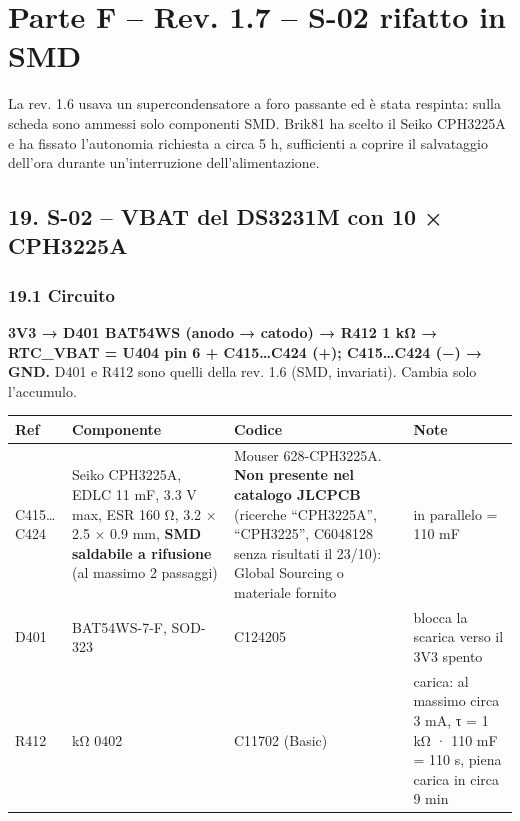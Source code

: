 \clearpage
\section[Parte F – Rev. 1.7 – S-02 rifatto in SMD]{Parte F – Rev. 1.7 – S-02 rifatto in SMD}

La rev. 1.6 usava un supercondensatore a foro passante ed è stata respinta: sulla scheda sono ammessi solo componenti SMD. Brik81 ha scelto il Seiko CPH3225A e ha fissato l'autonomia richiesta a circa 5 h, sufficienti a coprire il salvataggio dell'ora durante un'interruzione dell'alimentazione.

\subsection[19. S-02 – VBAT del DS3231M con 10 × CPH3225A]{19. S-02 – VBAT del DS3231M con 10 × CPH3225A }

\subsubsection[19.1 Circuito]{19.1 Circuito}

\textbf{3V3 → D401 BAT54WS (anodo → catodo) → R412 1 kΩ → RTC\_\allowbreak{}VBAT = U404 pin 6 + C415…C424 (+); C415…C424 (−) → GND.} D401 e R412 sono quelli della rev. 1.6 (SMD, invariati). Cambia solo l'accumulo.

{\footnotesize{}\setlength{\tabcolsep}{4pt}\renewcommand{\arraystretch}{1.1}
\begin{longtable}{>{\raggedright\arraybackslash}p{}>{\raggedright\arraybackslash}p{}>{\raggedright\arraybackslash}p{}>{\raggedright\arraybackslash}p{}}
\toprule
\textbf{Ref} & \textbf{Componente} & \textbf{Codice} & \textbf{Note} \\
\midrule
\endhead
\bottomrule\endfoot
C415…C424 & Seiko CPH3225A, EDLC 11 mF, 3.3 V max, ESR 160 Ω, 3.2 × 2.5 × 0.9 mm, \textbf{SMD saldabile a rifusione} (al massimo 2 passaggi) & Mouser 628-CPH3225A. \textbf{Non presente nel catalogo JLCPCB} (ricerche \textquotedblleft{}CPH3225A\textquotedblright{}, \textquotedblleft{}CPH3225\textquotedblright{}, C6048128 senza risultati il 23/\allowbreak{}10): Global Sourcing o materiale fornito & 10 in parallelo = 110 mF \\\midrule[0.15pt]
D401 & BAT54WS-7-F, SOD-323 & C124205 & blocca la scarica verso il 3V3 spento \\\midrule[0.15pt]
R412 & 1 kΩ 0402 & C11702 (Basic) & carica: al massimo circa 3 mA, τ = 1 kΩ · 110 mF = 110 s, piena carica in circa 9 min \\
\end{longtable}}

